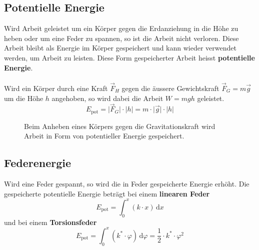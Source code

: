 \subsection{Potentielle Energie}
Wird Arbeit geleistet um ein Körper gegen die Erdanziehung in die Höhe zu heben oder um eine Feder zu spannen, so ist die Arbeit nicht verloren. Diese Arbeit bleibt als Energie im Körper gespeichert und kann wieder verwendet werden, um Arbeit zu leisten. Diese Form gespeicherter Arbeit heisst \textbf{potentielle Energie}. 
\\\\
Wird ein Körper durch eine Kraft $\overrightarrow{F}_H$ gegen die äussere Gewichtskraft $\overrightarrow{F}_G=m\overrightarrow{g}$ um die Höhe $h$ angehoben, so wird dabei die Arbeit $W=mgh$ geleistet.
\begin{equation}
\boxed{E_{\text{pot}}=\Big\vert\overrightarrow{F}_G \Big\vert \cdot \Big\vert h\Big\vert = m\cdot \Big\vert \overrightarrow{g}\Big\vert\cdot \Big\vert h\Big\vert }
\end{equation}
\begin{figure}[H]
\centering
\caption{Beim Anheben eines Körpers gegen die Gravitationskraft wird Arbeit in Form von potentieller Energie gespeichert.}
\label{fig_Ic}
\end{figure} 
\subsection{Federenergie}
Wird eine Feder gespannt, so wird die in Feder gespeicherte Energie erhöht. Die gespeicherte potentielle Energie beträgt bei einem \textbf{linearen Feder}
\begin{equation}
\boxed{E_{\text{pot}}=\int_{0}^x\left(k\cdot x\right)\,\text{d}x}
\end{equation}
und bei einem \textbf{Torsionsfeder}
\begin{equation}
\boxed{E_{\text{pot}}=\int_{0}^x\left(k^{*}\cdot \varphi\right)\,\text{d}\varphi=\dfrac{1}{2}\cdot k^*\cdot \varphi^2}
\end{equation}
